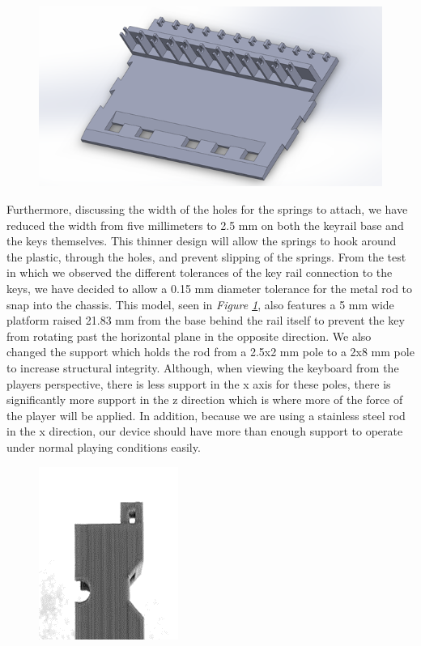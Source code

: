 \begin{figure}[h!]
  \centering
  \includegraphics[width=0.9\linewidth]{image/BaseModel3.png}
  \caption{}
  \label{fig:base_model3}
\end{figure}

Furthermore, discussing the width of the holes for the springs to attach, we have reduced the width from five millimeters to 2.5 mm on both the keyrail base and the keys themselves. This thinner design will allow the springs to hook around the plastic, through the holes, and prevent slipping of the springs. From the test in which we observed the different tolerances of the key rail connection to the keys, we have decided to allow a 0.15 mm diameter tolerance for the metal rod to snap into the chassis. This model, seen in \textit{Figure \ref{fig:base_model3}}, also features a 5 mm wide platform raised 21.83 mm from the base behind the rail itself to prevent the key from rotating past the horizontal plane in the opposite direction. We also changed the support which holds the rod from a 2.5x2 mm pole to a 2x8 mm pole to increase structural integrity. Although, when viewing the keyboard from the players perspective, there is less support in the x axis for these poles, there is significantly more support in the z direction which is where more of the force of the player will be applied. In addition, because we are using a stainless steel rod in the x direction, our device should have more than enough support to operate under normal playing conditions easily.

\begin{figure}[h!]
  \centering
  \includegraphics[width=0.25\linewidth]{image/Print5.png}
  \caption{}
  \label{fig:print5}
\end{figure}

